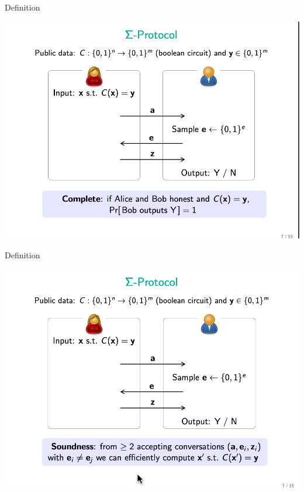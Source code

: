 \documentclass{beamer}
\begin{document}
\begin{frame}{Definition}
	\begin{minipage}{0.42\linewidth}
		\includegraphics[scale=0.4]{f4.png}
	\end{minipage}
\end{frame}


\begin{frame}{Definition}
	\begin{minipage}{0.42\linewidth}
		\includegraphics[scale=0.4]{f5.png}
	\end{minipage}
\end{frame}
\end{document}
